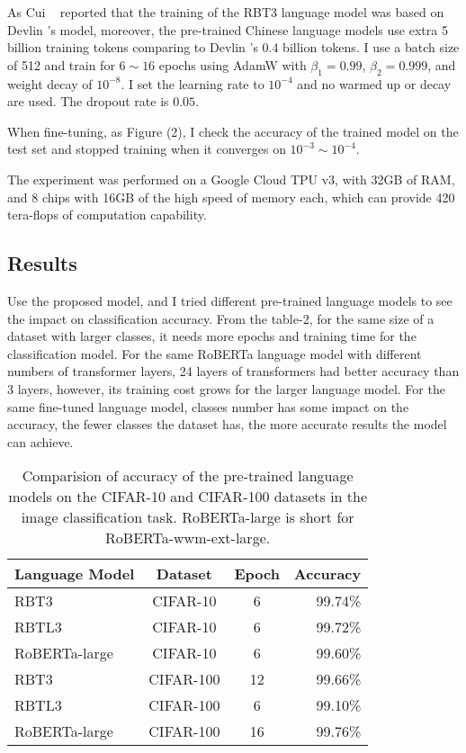 \documentclass[review]{cvpr}
\begin{document}
As Cui \etal~\cite{cui2020revisiting} reported that the training of the RBT3 language model was based on Devlin \etal's model,
moreover, the pre-trained Chinese language models use extra 5 billion training tokens comparing to Devlin \etal's 0.4 billion tokens.
I use a batch size of 512 and train for $6\sim16$ epochs using AdamW with $\beta_1=0.99$, $\beta_2=0.999$, and weight decay of $10^{-8}$.
I set the learning rate to $10^{-4}$ and no warmed up or decay are used.
The dropout rate is $0.05$.

\par When fine-tuning, as Figure (2), I check the accuracy of the trained model on the test set and stopped training when it converges on $10^{-3}\sim10^{-4}$.

\par The experiment was performed on a Google Cloud TPU v3, with 32GB of RAM, and 8 chips with 16GB of the high speed of memory each,
which can provide 420 tera-flops of computation capability.

\subsection{Results}

Use the proposed model, and I tried different pre-trained language models to see the impact on classification accuracy.
From the table-2, for the same size of a dataset with larger classes, it needs more epochs and training time for the classification model.
For the same RoBERTa language model with different numbers of transformer layers, 24 layers of transformers had better accuracy than 3 layers,
however, its training cost grows for the larger language model.
For the same fine-tuned language model, classes number has some impact on the accuracy,
the fewer classes the dataset has, the more accurate results the model can achieve.


\begin{table}
\begin{center}
\begin{tabular}{|l|c|c|r|}
\hline
Language Model 	& Dataset & Epoch & Accuracy \\
\hline\hline
RBT3   & CIFAR-10 & 6	&	99.74\% \\
RBTL3  & CIFAR-10 & 6	&	99.72\% \\
RoBERTa-large  & CIFAR-10 & 6	&	99.60\% \\
\hline
RBT3   & CIFAR-100 & 12	&	99.66\% \\
RBTL3  & CIFAR-100 & 6  & 	99.10\% \\
RoBERTa-large & CIFAR-100 & 16 &	99.76\% \\
\hline
\end{tabular}
\end{center}
\caption{Comparision of accuracy of the pre-trained language models on the CIFAR-10 and CIFAR-100 datasets in the image classification task.
RoBERTa-large is short for RoBERTa-wwm-ext-large.}
\end{table}
\end{document}
